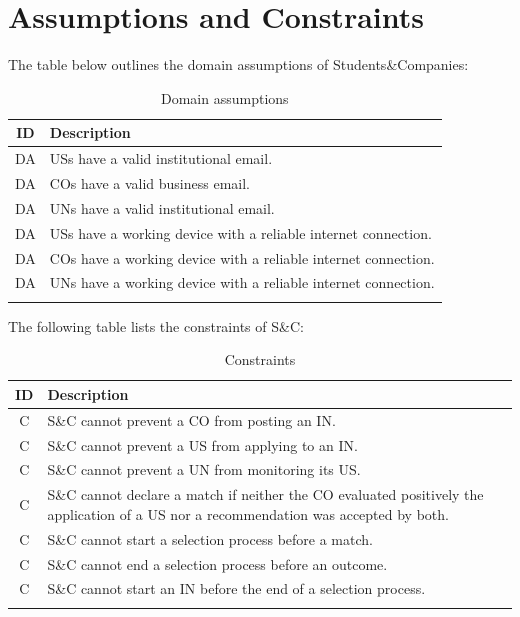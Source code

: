\section{Assumptions and Constraints}
The table below outlines the domain assumptions of Students\&Companies:

\setcounter{da}{1}
\newcommand{\dac}{\theda\stepcounter{da}}
\renewcommand{\arraystretch}{1.5}
\begin{longtable}{|c|p{12.5cm}|}
    \hline \rowcolor{polimiblue!40}
    \textbf{ID} & \textbf{Description} \\ \hline \hline
    DA\dac & USs have a valid institutional email. \\ \hline
    DA\dac & COs have a valid business email. \\ \hline
    DA\dac & UNs have a valid institutional email. \\ \hline
    DA\dac & USs have a working device with a reliable internet connection. \\ \hline
    DA\dac & COs have a working device with a reliable internet connection. \\ \hline
    DA\dac & UNs have a working device with a reliable internet connection. \\ \hline
\caption{Domain assumptions}
\end{longtable}

The following table lists the constraints of S\&C: 

\setcounter{c}{1}
\newcommand{\cc}{\thec\stepcounter{c}}
\renewcommand{\arraystretch}{1.5}
\begin{longtable}{|c|p{12.5cm}|}
    \hline \rowcolor{polimiblue!40}
    \textbf{ID} & \textbf{Description} \\ \hline \hline
    C\cc & S\&C cannot prevent a CO from posting an IN. \\ \hline
    C\cc & S\&C cannot prevent a US from applying to an IN. \\ \hline
    C\cc & S\&C cannot prevent a UN from monitoring its US. \\ \hline
    C\cc & S\&C cannot declare a match if neither the CO evaluated positively the application of a US nor a recommendation was accepted by both. \\ \hline
    C\cc & S\&C cannot start a selection process before a match. \\ \hline
    C\cc & S\&C cannot end a selection process before an outcome. \\ \hline
    C\cc & S\&C cannot start an IN before the end of a selection process. \\ \hline
\caption{Constraints}
\end{longtable}
